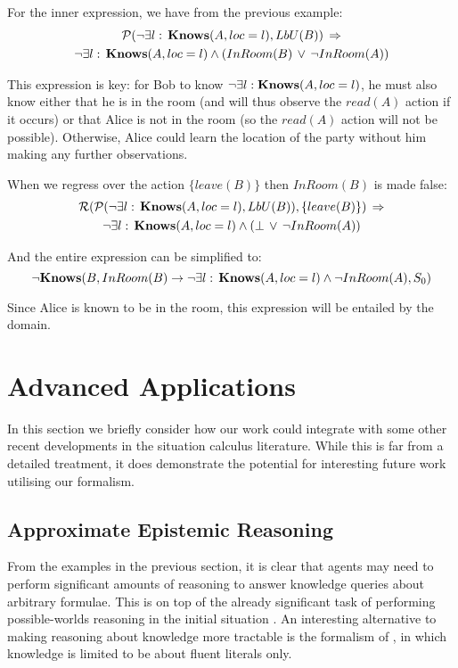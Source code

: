 For the inner expression, we have from the previous example:\begin{multline*}
\mathcal{P}(\neg\exists l:\,\mathbf{Knows}(A,loc=l),LbU(B))\,\Rightarrow\\
\neg\exists l:\,\mathbf{Knows}(A,loc=l)\wedge\left(InRoom(B)\,\vee\,\neg InRoom(A)\right)\end{multline*}


This expression is key: for Bob to know $\neg\exists l:\mathbf{Knows}(A,loc=l)$,
he must also know either that he is in the room (and will thus observe
the $read(A)$ action if it occurs) or that Alice is not in the room
(so the $read(A)$ action will not be possible). Otherwise, Alice
could learn the location of the party without him making any further
observations.

When we regress over the action $\{leave(B)\}$ then $InRoom(B)$
is made false:\begin{multline*}
\mathcal{R}(\mathcal{P}(\neg\exists l:\,\mathbf{Knows}(A,loc=l),LbU(B)),\{leave(B)\})\,\Rightarrow\\
\neg\exists l:\,\mathbf{Knows}(A,loc=l)\wedge\left(\bot\,\vee\,\neg InRoom(A)\right)\end{multline*}


And the entire expression can be simplified to:\[
\neg\mathbf{Knows}(B,InRoom(B)\rightarrow\neg\exists l:\,\mathbf{Knows}(A,loc=l)\wedge\neg InRoom(A),S_{0})\]


Since Alice is known to be in the room, this expression will be entailed
by the domain.


\section{Advanced Applications\label{sec:Knowledge:Advances}}

In this section we briefly consider how our work could integrate with
some other recent developments in the situation calculus literature.
While this is far from a detailed treatment, it does demonstrate the
potential for interesting future work utilising our formalism.


\subsection{Approximate Epistemic Reasoning}

From the examples in the previous section, it is clear that agents
may need to perform significant amounts of reasoning to answer knowledge
queries about arbitrary formulae. This is on top of the already significant
task of performing possible-worlds reasoning in the initial situation
\citep{Petrick06thesis}. An interesting alternative to making reasoning
about knowledge more tractable is the formalism of \citet{demolombe00tractable_sc_belief},
in which knowledge is limited to be about fluent literals only.

